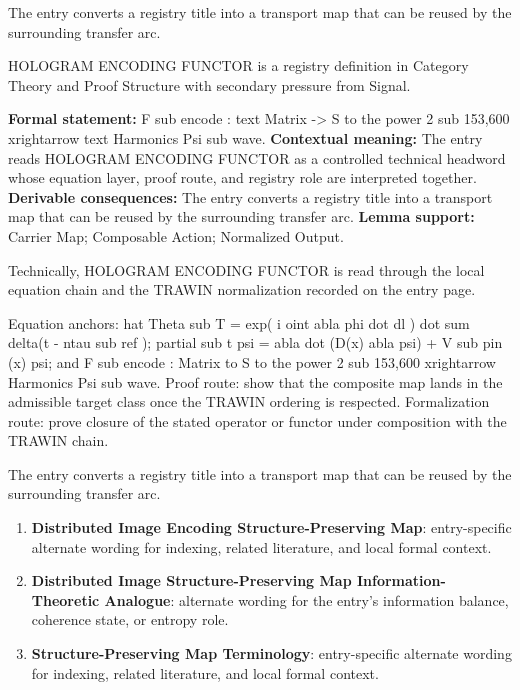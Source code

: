 The entry converts a registry title into a transport map that can be reused by the surrounding transfer arc.
\clearpage


\begingroup\small
{}
HOLOGRAM ENCODING FUNCTOR is a registry definition in Category Theory and Proof Structure with secondary pressure from Signal.

\begingroup\footnotesize\setlength{\emergencystretch}{3em}\sloppy
\textbf{Formal statement:} F sub encode : text Matrix -> S to the power 2 sub 153,600 xrightarrow text Harmonics Psi sub wave. \textbf{Contextual meaning:} The entry reads HOLOGRAM ENCODING FUNCTOR as a controlled technical headword whose equation layer, proof route, and registry role are interpreted together. \textbf{Derivable consequences:} The entry converts a registry title into a transport map that can be reused by the surrounding transfer arc. \textbf{Lemma support:} Carrier Map; Composable Action; Normalized Output.\par
\endgroup

Technically, HOLOGRAM ENCODING FUNCTOR is read through the local equation chain and the TRAWIN normalization recorded on the entry page.

Equation anchors: hat Theta sub T = exp( i oint abla phi dot dl ) dot sum delta(t - ntau sub ref ); partial sub t psi = abla dot (D(x) abla psi) + V sub pin (x) psi; and F sub encode : Matrix to S to the power 2 sub 153,600 xrightarrow Harmonics Psi sub wave. Proof route: show that the composite map lands in the admissible target class once the TRAWIN ordering is respected. Formalization route: prove closure of the stated operator or functor under composition with the TRAWIN chain.

The entry converts a registry title into a transport map that can be reused by the surrounding transfer arc.
\endgroup

\begin{enumerate}[leftmargin=1.6em,itemsep=6pt,topsep=4pt]
\item \textbf{Distributed Image Encoding Structure-Preserving Map}: entry-specific alternate wording for indexing, related literature, and local formal context.
\item \textbf{Distributed Image Structure-Preserving Map Information-Theoretic Analogue}: alternate wording for the entry's information balance, coherence state, or entropy role.
\item \textbf{Structure-Preserving Map Terminology}: entry-specific alternate wording for indexing, related literature, and local formal context.
\end{enumerate}

